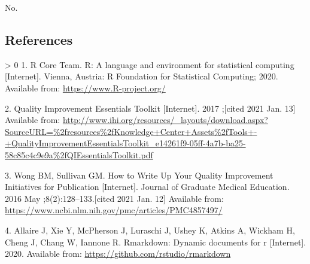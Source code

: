 \documentclass[
]{article}
\newlength{\cslhangindent}
\newenvironment{CSLReferences}[3] %
 {%
  \setlength{\parindent}{0pt}
  \ifodd #1 \everypar{\setlength{\hangindent}{\cslhangindent}}\ignorespaces\fi
  \ifnum #2 > 0
  \setlength{\parskip}{#2\baselineskip}
  \fi
 }%
 {}
\begin{document}
No.~

\hypertarget{references}{%
\subsection*{References}\label{references}}

\hypertarget{refs}{}
\begin{CSLReferences}{0}{0}
\leavevmode\hypertarget{ref-R-base}{}%
1. R Core Team. R: A language and environment for statistical computing {[}Internet{]}. Vienna, Austria: R Foundation for Statistical Computing; 2020. Available from: \url{https://www.R-project.org/}

\leavevmode\hypertarget{ref-noauthor_quality_2017}{}%
2. Quality {Improvement} {Essentials} {Toolkit} {[}Internet{]}. 2017 ;{[}cited 2021 Jan. 13{]} Available from: \url{http://www.ihi.org/resources/_layouts/download.aspx?SourceURL=\%2fresources\%2fKnowledge+Center+Assets\%2fTools+-+QualityImprovementEssentialsToolkit_e14261f9-05ff-4a7b-ba25-58c85c4c9e9a\%2fQIEssentialsToolkit.pdf}

\leavevmode\hypertarget{ref-wong_how_2016}{}%
3. Wong BM, Sullivan GM. How to {Write} {Up} {Your} {Quality} {Improvement} {Initiatives} for {Publication} {[}Internet{]}. Journal of Graduate Medical Education. 2016 May ;8(2):128--133.{[}cited 2021 Jan. 12{]} Available from: \url{https://www.ncbi.nlm.nih.gov/pmc/articles/PMC4857497/}

\leavevmode\hypertarget{ref-R-rmarkdown}{}%
4. Allaire J, Xie Y, McPherson J, Luraschi J, Ushey K, Atkins A, Wickham H, Cheng J, Chang W, Iannone R. Rmarkdown: Dynamic documents for r {[}Internet{]}. 2020. Available from: \url{https://github.com/rstudio/rmarkdown}

\end{CSLReferences}
\end{document}
